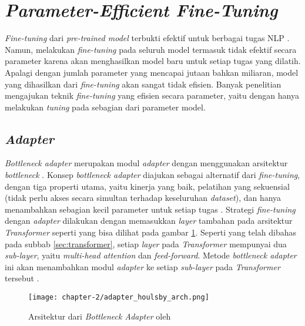 \section{\textit{Parameter-Efficient Fine-Tuning}}
\label{sec:peft}

\textit{Fine-tuning} dari \textit{pre-trained model} terbukti efektif untuk berbagai tugas NLP \parencite{fine_tuning}. Namun, melakukan \textit{fine-tuning} pada seluruh model termasuk tidak efektif secara parameter karena akan menghasilkan model baru untuk setiap tugas yang dilatih. Apalagi dengan jumlah parameter yang mencapai jutaan bahkan miliaran, model yang dihasilkan dari \textit{fine-tuning} akan sangat tidak efisien. Banyak penelitian mengajukan teknik \textit{fine-tuning} yang efisien secara parameter, yaitu \PEFT dengan hanya melakukan \textit{tuning} pada sebagian dari parameter model.

\subsection{\textit{Adapter}}

\textit{Bottleneck adapter} merupakan modul \textit{adapter} dengan menggunakan arsitektur \textit{bottleneck} \parencite{adapter_houlsby}. Konsep \textit{bottleneck adapter} diajukan sebagai alternatif dari \textit{fine-tuning}, dengan tiga properti utama, yaitu kinerja yang baik, pelatihan yang sekuensial (tidak perlu akses secara simultan terhadap keseluruhan \textit{dataset}), dan hanya menambahkan sebagian kecil parameter untuk setiap tugas \parencite{adapter_houlsby}. Strategi \textit{fine-tuning} dengan \textit{adapter} dilakukan dengan memasukkan \textit{layer} tambahan pada arsitektur \textit{Transformer} seperti yang bisa dilihat pada gambar \ref{fig:adapters_houlsby_arch}. Seperti yang telah dibahas pada subbab \ref{sec:transformer}, setiap \textit{layer} pada \textit{Transformer} mempunyai dua \textit{sub-layer}, yaitu \textit{multi-head attention} dan \textit{feed-forward}. Metode \textit{bottleneck adapter} ini akan menambahkan modul \textit{adapter} ke setiap \textit{sub-layer} pada \textit{Transformer} tersebut \parencite{adapter_houlsby}.

\begin{figure}[h]
    \vspace{0.25cm}
    \centering
    \texttt{[image: chapter-2/adapter\_houlsby\_arch.png]}
    \caption{Arsitektur dari \textit{Bottleneck Adapter} oleh \citeauthor{adapter_houlsby} \parencite{adapter_houlsby}}
    \label{fig:adapters_houlsby_arch}
\end{figure}

